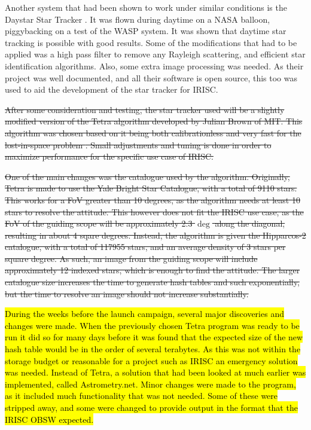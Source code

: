 Another system that had been shown to work under similar conditions is the Daystar Star Tracker \cite{daystar}. It was flown during daytime on a NASA balloon, piggybacking on a test of the WASP system. It was shown that daytime star tracking is possible with good results. Some of the modifications that had to be applied was a high pass filter to remove any Rayleigh scattering, and efficient star identification algorithms. Also, some extra image processing was needed. As their project was well documented, and all their software is open source, this too was used to aid the development of the star tracker for IRISC.

\st{After some consideration and testing, the star tracker used will be a slightly modified version of the Tetra algorithm developed by Julian Brown of MIT. This algorithm was chosen based on it being both calibrationless and very fast for the lost-in-space problem \mbox{\cite{tetra}}. Small adjustments and tuning is done in order to maximize performance for the specific use case of IRISC.}

\st{One of the main changes was the catalogue used by the algorithm. Originally, Tetra is made to use the Yale Bright Star Catalogue, with a total of 9110 stars. This works for a FoV greater than 10 degrees, as the algorithm needs at least 10 stars to resolve the attitude. This however does not fit the IRISC use case, as the FoV of the guiding scope will be approximately 2.3 $\deg$ along the diagonal, resulting in about 4 sqare degrees. Instead, the algorithm is given the Hipparcos-2 catalogue, with a total of 117955 stars, and an average density of 3 stars per square degree. As such, an image from the guiding scope will include approximately 12 indexed stars, which is enough to find the attitude. The larger catalogue size increases the time to generate hash tables and such exponentially, but the time to resolve an image should not increase substantially.}

\hl{During the weeks before the launch campaign, several major discoveries and changes were made. When the previously chosen Tetra program was ready to be run it did so for many days before it was found that the expected size of the new hash table would be in the order of several terabytes. As this was not within the storage budget or reasonable for a project such as IRISC an emergency solution was needed. Instead of Tetra, a solution that had been looked at much earlier was implemented, called Astrometry.net. Minor changes were made to the program, as it included much functionality that was not needed. Some of these were stripped away, and some were changed to provide output in the format that the IRISC OBSW expected.}



\raggedbottom
